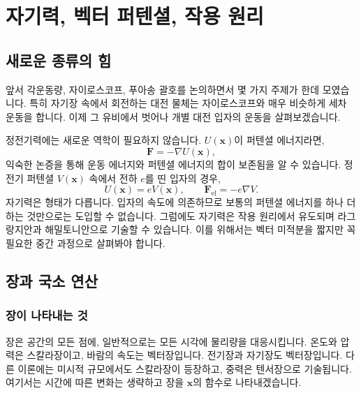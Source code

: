 \chapter{자기력, 벡터 퍼텐셜, 작용 원리}


\section{새로운 종류의 힘}

앞서 각운동량, 자이로스코프, 푸아송 괄호를 논의하면서 몇 가지 주제가 한데 모였습니다. 특히 자기장 속에서 회전하는 대전 물체는 자이로스코프와 매우 비슷하게 세차 운동을 합니다. 이제 그 유비에서 벗어나 개별 대전 입자의 운동을 살펴보겠습니다.

정전기력에는 새로운 역학이 필요하지 않습니다. \(U(\mathbf x)\)이 퍼텐셜 에너지라면,
\begin{equation}
  \mathbf F=-\nabla U(\mathbf x),
\end{equation}
익숙한 논증을 통해 운동 에너지와 퍼텐셜 에너지의 합이 보존됨을 알 수 있습니다. 정전기 퍼텐셜 \(V(\mathbf x)\) 속에서 전하 \(e\)를 띤 입자의 경우,
\begin{equation}
  U(\mathbf x)=eV(\mathbf x),
  \qquad
  \mathbf F_{\mathrm{el}}=-e\nabla V.
\end{equation}
자기력은 형태가 다릅니다. 입자의 속도에 의존하므로 보통의 퍼텐셜 에너지를 하나 더하는 것만으로는 도입할 수 없습니다. 그럼에도 자기력은 작용 원리에서 유도되며 라그랑지안과 해밀토니안으로 기술할 수 있습니다. 이를 위해서는 벡터 미적분을 짧지만 꼭 필요한 중간 과정으로 살펴봐야 합니다.

\section{장과 국소 연산}

\subsection{장이 나타내는 것}

장은 공간의 모든 점에, 일반적으로는 모든 시각에 물리량을 대응시킵니다. 온도와 압력은 스칼라장이고, 바람의 속도는 벡터장입니다. 전기장과 자기장도 벡터장입니다. 다른 이론에는 미시적 규모에서도 스칼라장이 등장하고, 중력은 텐서장으로 기술됩니다. 여기서는 시간에 따른 변화는 생략하고 장을 \(\mathbf x\)의 함수로 나타내겠습니다.

